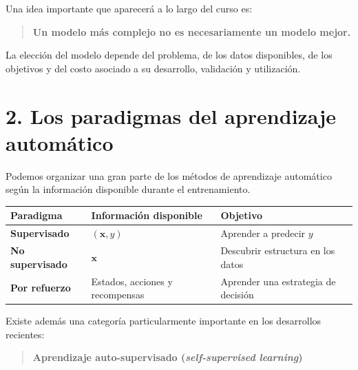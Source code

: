 \documentclass[
  letterpaper,
  DIV=11,
  numbers=noendperiod]{scrartcl}
\newcounter{none} %
\begin{document}
Una idea importante que aparecerá a lo largo del curso es:

\begin{quote}
\textbf{Un modelo más complejo no es necesariamente un modelo mejor.}
\end{quote}

La elección del modelo depende del problema, de los datos disponibles,
de los objetivos y del costo asociado a su desarrollo, validación y
utilización.

\section{2. Los paradigmas del aprendizaje
automático}\label{los-paradigmas-del-aprendizaje-automuxe1tico}

Podemos organizar una gran parte de los métodos de aprendizaje
automático según la información disponible durante el entrenamiento.

{\def\LTcaptype{none} %
\begin{longtable}[]{@{}
  >{\raggedright\arraybackslash}p{}
  >{\raggedright\arraybackslash}p{}
  >{\raggedright\arraybackslash}p{}@{}}
\toprule\noalign{}
\begin{minipage}[b]{\linewidth}\raggedright
Paradigma
\end{minipage} & \begin{minipage}[b]{\linewidth}\raggedright
Información disponible
\end{minipage} & \begin{minipage}[b]{\linewidth}\raggedright
Objetivo
\end{minipage} \\
\midrule\noalign{}
\endhead
\bottomrule\noalign{}
\endlastfoot
\textbf{Supervisado} & \((\mathbf{x},y)\) & Aprender a predecir \(y\) \\
\textbf{No supervisado} & \(\mathbf{x}\) & Descubrir estructura en los
datos \\
\textbf{Por refuerzo} & Estados, acciones y recompensas & Aprender una
estrategia de decisión \\
\end{longtable}
}

Existe además una categoría particularmente importante en los
desarrollos recientes:

\begin{quote}
\textbf{Aprendizaje auto-supervisado (\emph{self-supervised learning})}
\end{quote}
\end{document}
